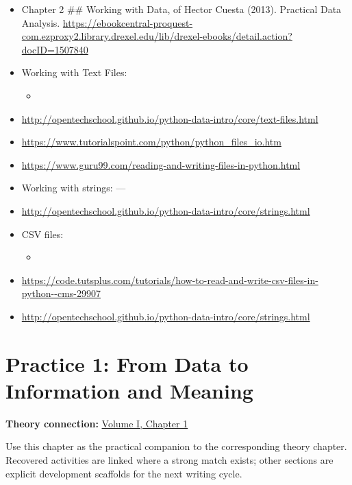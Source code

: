 \documentclass[
  letterpaper,
]{scrbook}
\providecommand{\tightlist}{%
  \setlength{\itemsep}{0pt}\setlength{\parskip}{0pt}}
\begin{document}
\begin{itemize}
\item
  Chapter 2 \#\# Working with Data, of Hector Cuesta (2013). Practical
  Data Analysis.
  \ul{https://ebookcentral-proquest-com.ezproxy2.library.drexel.edu/lib/drexel-ebooks/detail.action?docID=1507840}
\item
  Working with Text Files:

  \begin{itemize}
  \tightlist
  \item
  \end{itemize}
\item
  \ul{http://opentechschool.github.io/python-data-intro/core/text-files.html}
\item
  \ul{https://www.tutorialspoint.com/python/python\_files\_io.htm}
\item
  \ul{https://www.guru99.com/reading-and-writing-files-in-python.html}
\item
  Working with strings: ---
\item
  \ul{http://opentechschool.github.io/python-data-intro/core/strings.html}
\item
  CSV files:

  \begin{itemize}
  \tightlist
  \item
  \end{itemize}
\item
  \ul{https://code.tutsplus.com/tutorials/how-to-read-and-write-csv-files-in-python-\/-cms-29907}
\item
  \ul{http://opentechschool.github.io/python-data-intro/core/strings.html}
\end{itemize}

\chapter*{Practice 1: From Data to Information and
Meaning}\label{ch-practice-01}


\textbf{Theory connection:} \hyperref[ch-data-meaning]{Volume I, Chapter
1}

Use this chapter as the practical companion to the corresponding theory
chapter. Recovered activities are linked where a strong match exists;
other sections are explicit development scaffolds for the next writing
cycle.
\end{document}
